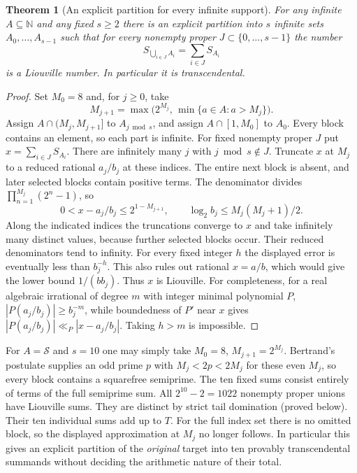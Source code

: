 \documentclass[11pt,letterpaper]{article}
\newtheorem{theorem}{Theorem}[section]
\newcommand{\N}{\mathbb N}
\begin{document}
\begin{theorem}[An explicit partition for every infinite support]\label{thm:all-but-full}
For any infinite $A\subseteq\N$ and any fixed $s\ge2$ there is an
explicit partition into $s$ infinite sets $A_0,\ldots,A_{s-1}$ such
that for every nonempty proper $J\subset\{0,\ldots,s-1\}$ the number
\[
 S_{\bigcup_{i\in J} A_i}=\sum_{i\in J}S_{A_i}
\]
is a Liouville number. In particular it is transcendental.
\end{theorem}
\begin{proof}
Set $M_0=8$ and, for $j\ge0$, take
\[
 M_{j+1}=\max\big(2^{M_j},\,\min\{a\in A:a>M_j\}\big).
\]
Assign $A\cap(M_j,M_{j+1}]$ to $A_{j\bmod s}$, and assign
$A\cap[1,M_0]$ to $A_0$. Every block contains an element, so each
part is infinite. For fixed nonempty proper $J$ put $x=\sum_{i\in J}S_{A_i}$.
There are infinitely many $j$ with $j\bmod s\notin J$. Truncate $x$ at
$M_j$ to a reduced rational $a_j/b_j$ at these indices. The entire
next block is absent, and later selected blocks contain positive terms.
The denominator divides $\prod_{n=1}^{M_j}(2^n-1)$, so
\[
 0<x-a_j/b_j\le2^{1-M_{j+1}},\qquad
 \log_2 b_j\le M_j(M_j+1)/2.
\]
Along the indicated indices the truncations converge to $x$ and
take infinitely many distinct values, because further selected blocks
occur. Their reduced denominators tend to infinity. For every fixed
integer $h$ the displayed error is eventually less than $b_j^{-h}$.
This also rules out rational $x=a/b$, which would give the lower
bound $1/(bb_j)$. Thus $x$ is Liouville. For completeness, for a
real algebraic irrational of degree $m$ with integer minimal polynomial
$P$, $|P(a_j/b_j)|\ge b_j^{-m}$, while boundedness of $P'$ near $x$
gives $|P(a_j/b_j)|\ll_P|x-a_j/b_j|$. Taking $h>m$ is impossible.
\end{proof}

For $A=\mathcal S$ and $s=10$ one may simply take $M_0=8$,
$M_{j+1}=2^{M_j}$. Bertrand's postulate supplies an odd prime
$p$ with $M_j<2p<2M_j$ for these even $M_j$, so every block
contains a squarefree semiprime. The ten fixed sums consist entirely of
terms of the full semiprime sum. All $2^{10}-2=1022$ nonempty proper
unions have Liouville sums. They are distinct by strict tail
domination (proved below). Their ten individual sums add up to $T$.
For the full index set there is no omitted block, so the displayed
approximation at $M_j$ no longer follows. In particular this gives an
explicit partition of the \emph{original} target into ten provably
transcendental summands without deciding the arithmetic nature of their total.
\end{document}
